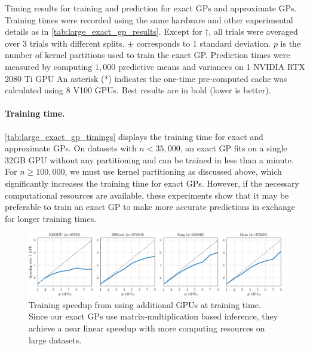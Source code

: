 \begin{table}[t!]
  \caption{
    Timing results for training and prediction for exact GPs and approximate GPs.
    Training times were recorded using the same hardware and other experimental details as in \autoref{tab:large_exact_gp_results}.
    Except for $\dagger$, all trials were averaged over 3 trials with different splits.  $\pm$ corresponds to 1 standard deviation.
	$p$ is the number of kernel partitions used to train the exact GP.
	Prediction times were measured by computing $1,\!000$ predictive means
	and variances on 1 NVIDIA RTX 2080 Ti GPU
    An asterisk (*) indicates the one-time pre-computed cache was calculated using 8 V100 GPUs.
    Best results are in bold (lower is better).
  }
  \label{tab:large_exact_gp_timings}
  \centering
  \resizebox{\textwidth}{!}{%
    
  }
\end{table}


\paragraph{Training time.}
\autoref{tab:large_exact_gp_timings} displays the training time for exact and approximate GPs.
On datasets with $n < 35,\!000$, an exact GP fits on a
single 32GB GPU without any partitioning and can be trained in less than a minute.
For $n \geq 100,\!000$, we must use kernel partitioning as discussed above, which significantly increases the
training time for exact GPs. However, if the necessary computational
resources are available, these experiments show that it may be preferable to
train an exact GP to make more accurate predictions in exchange for longer training times.

\begin{figure}[h!]
  \centering
  \includegraphics[width=\linewidth]{figures/gpu_speedup.pdf}
  \caption{
    Training speedup from using additional GPUs at training time.
    Since our exact GPs use matrix-multiplication based inference, they achieve a near linear speedup with more computing resources on large datasets.
  }
  \label{fig:gpu_speedup}
\end{figure}


